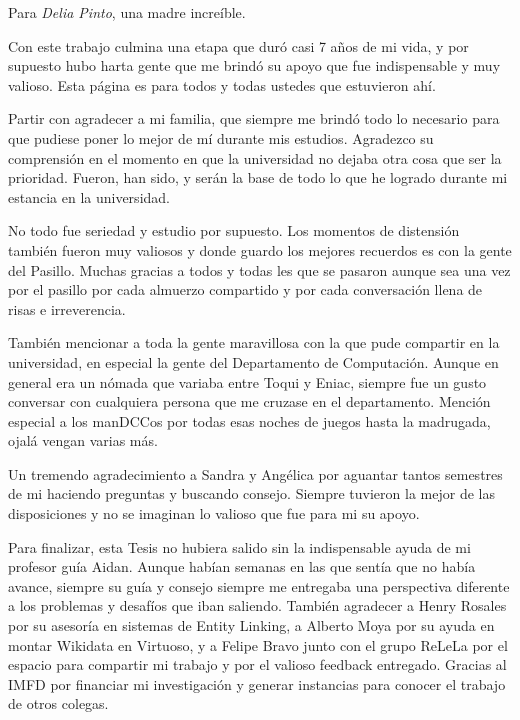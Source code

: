 \documentclass[upright, contnum]{umemoria}
\begin{document}
\begin{dedicatoria} %
Para \emph{Delia Pinto}, una madre increíble.
\end{dedicatoria}

\begin{thanks} %
Con este trabajo culmina una etapa que duró casi 7 años de mi vida, y por supuesto hubo harta gente 
que me brindó su apoyo que fue indispensable y muy valioso. Esta página es para todos y todas ustedes 
que estuvieron ahí. 

Partir con agradecer a mi familia, que siempre me brindó todo lo necesario para que pudiese poner lo 
mejor de mí durante mis estudios. Agradezco su comprensión en el momento en que la universidad no 
dejaba otra cosa que ser la prioridad. Fueron, han sido, y serán la base de todo lo que he logrado 
durante mi estancia en la universidad.

No todo fue seriedad y estudio por supuesto. Los momentos de distensión también fueron muy valiosos y 
donde guardo los mejores recuerdos es con la gente del Pasillo. Muchas gracias a todos y todas les 
que se pasaron aunque sea una vez por el pasillo por cada almuerzo compartido y por cada conversación 
llena de risas e irreverencia.

También mencionar a toda la gente maravillosa con la que pude compartir en la universidad, en especial 
la gente del Departamento de Computación. Aunque en general era un nómada que variaba entre Toqui y 
Eniac, siempre fue un gusto conversar con cualquiera persona que me cruzase en el departamento. 
Mención especial a los manDCCos por todas esas noches de juegos hasta la madrugada, ojalá vengan 
varias más.

Un tremendo agradecimiento a Sandra y Angélica por aguantar tantos semestres de mi haciendo preguntas 
y buscando consejo. Siempre tuvieron la mejor de las disposiciones y no se imaginan lo valioso que 
fue para mi su apoyo.

Para finalizar, esta Tesis no hubiera salido sin la indispensable ayuda de mi profesor guía Aidan. 
Aunque habían semanas en las que sentía que no había avance, siempre su guía y consejo siempre me 
entregaba una perspectiva diferente a los problemas y desafíos que iban saliendo. También agradecer a 
Henry Rosales por su asesoría en sistemas de Entity Linking, a Alberto Moya por su ayuda en montar 
Wikidata en Virtuoso, y a Felipe Bravo junto con el grupo ReLeLa por el espacio para compartir mi 
trabajo y por el valioso feedback entregado. Gracias al IMFD por financiar mi investigación y generar 
instancias para conocer el trabajo de otros colegas.
    
\end{thanks}
\cleardoublepage
\end{document}
